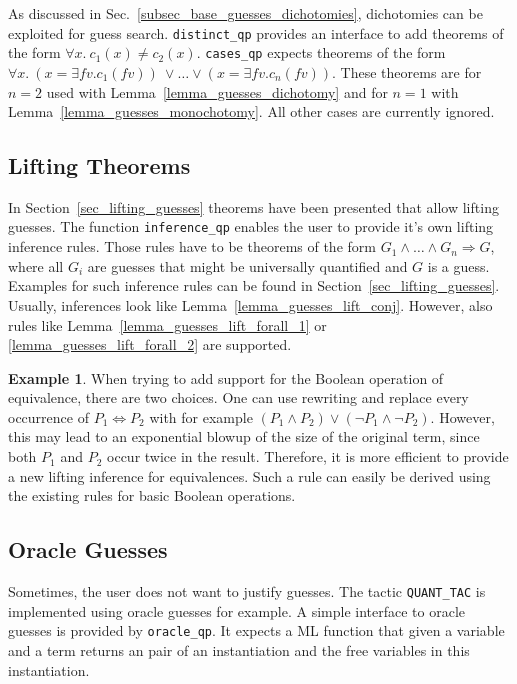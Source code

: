 \documentclass[a4paper,12pt,DIV=12,oneside]{scrbook}
\newcommand{\fv}{\textit{fv}}
\theoremstyle{definition}
\newtheorem{example}[lemma]{Example}
\theoremstyle{remark}
\begin{document}
As discussed in Sec.~\ref{subsec_base_guesses_dichotomies}, dichotomies can be exploited for guess search.
\texttt{distinct\_qp} provides an interface to add theorems
of the form $\forall x.\ c_1(x) \neq c_2(x)$. 
\texttt{cases\_qp} expects theorems of the form
$\forall x. \ (x = \exists \fv. c_1(\fv))\ \vee \ldots \vee (x = \exists \fv. c_n(\fv))$. 
These theorems are for $n = 2$ used with Lemma~\ref{lemma_guesses_dichotomy} and
for $n=1$ with Lemma~\ref{lemma_guesses_monochotomy}. All other cases are currently ignored.

\subsection{Lifting Theorems}

In Section~\ref{sec_lifting_guesses} theorems have been presented that
allow lifting guesses. The function \texttt{inference\_qp} enables the
user to provide it's own lifting inference rules. Those rules have to
be theorems of the form $G_1 \wedge \ldots \wedge G_n \Longrightarrow
G$, where all $G_i$ are guesses that might be universally quantified
and $G$ is a guess. Examples for such inference rules can be found in
Section~\ref{sec_lifting_guesses}. Usually, inferences look like
Lemma~\ref{lemma_guesses_lift_conj}. However, also rules like
Lemma~\ref{lemma_guesses_lift_forall_1} or
\ref{lemma_guesses_lift_forall_2} are supported.

\begin{example}
When trying to add support for the Boolean operation of equivalence,
there are two choices.  One can use rewriting and replace every
occurrence of $P_1 \Leftrightarrow P_2$ with for example $(P_1 \wedge
P_2) \vee (\neg P_1 \wedge \neg P_2)$. However, this may lead to an
exponential blowup of the size of the original term, since both $P_1$
and $P_2$ occur twice in the result. Therefore, it is more efficient to 
provide a new lifting inference for equivalences. Such a rule can easily be derived
using the existing rules for basic Boolean operations.
\end{example}

\subsection{Oracle Guesses}

Sometimes, the user does not want to justify guesses. The tactic
\texttt{QUANT\_TAC} is implemented using oracle guesses for example. 
A simple interface to oracle guesses is provided by \texttt{oracle\_qp}.
It expects a ML function that given a variable and a term returns
an pair of an instantiation and the free variables in this instantiation.
\end{document}

